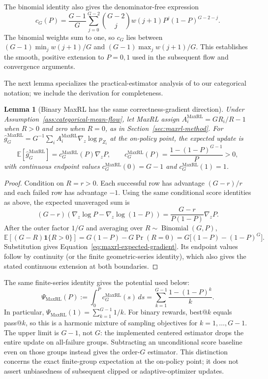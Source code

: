\documentclass{article}
\newcommand{\1}{\mathbf 1}
\newcommand{\E}{\mathbb E}
\newtheorem{lemma}{Lemma}[section]
\theoremstyle{remark}
\theoremstyle{definition}
\theoremstyle{plain}
\begin{document}
The binomial identity also gives the denominator-free expression
\[
 c_G(P)=\frac{G-1}{G}\sum_{j=0}^{G-2}\binom{G-2}{j}
 w(j+1)P^j(1-P)^{G-2-j}.
\]
The binomial weights sum to one, so $c_G$ lies between
$(G-1)\min_j w(j+1)/G$ and $(G-1)\max_j w(j+1)/G$.
This establishes the smooth, positive extension to $P=0,1$ used in the
subsequent flow and convergence arguments.

The next lemma specializes the practical-estimator analysis of
\citet[Section~4.3 and App.~D, Theorem~5]{tajwar2026maxrl}
to our categorical notation; we include the derivation for completeness.

\begin{lemma}[Binary MaxRL has the same correctness-gradient direction]
\label{lem:maxrl-mean}
Under Assumption~\ref{ass:categorical-mean-flow}, let MaxRL assign
$A_i^{\mathrm{MaxRL}}=GR_i/R-1$ when $R>0$ and zero when $R=0$, as in
Section~\ref{sec:maxrl-method}. For
$\widehat g_G^{\mathrm{MaxRL}}=G^{-1}\sum_i
 A_i^{\mathrm{MaxRL}}\nabla_z\log p_{Z_i}$ at the on-policy point, the
expected update is
\begin{equation}
  \E[\widehat g_G^{\mathrm{MaxRL}}]
  =c_G^{\mathrm{MaxRL}}(P)\nabla_zP,
  \qquad
  c_G^{\mathrm{MaxRL}}(P)
  =\frac{1-(1-P)^{G-1}}{P}>0,
  \label{eq:maxrl-expected-gradient}
\end{equation}
with continuous endpoint values
$c_G^{\mathrm{MaxRL}}(0)=G-1$ and
$c_G^{\mathrm{MaxRL}}(1)=1$.
\end{lemma}

\begin{proof}
Condition on $R=r>0$. Each successful row has advantage $(G-r)/r$ and each
failed row has advantage $-1$. Using the same conditional score identities as
above, the expected unaveraged sum is
\[
  (G-r)\!\left(\nabla_z\log P-\nabla_z\log(1-P)\right)
  =\frac{G-r}{P(1-P)}\nabla_zP.
\]
After the outer factor $1/G$ and averaging over
$R\sim\operatorname{Binomial}(G,P)$,
\[
 \E[(G-R)\1\{R>0\}]
 =G(1-P)-G\Pr(R=0)
 =G\big[(1-P)-(1-P)^G\big].
\]
Substitution gives Equation~\eqref{eq:maxrl-expected-gradient}. Its endpoint
values follow by continuity (or the finite geometric-series identity), which
also gives the stated continuous extension at both boundaries.
\end{proof}

The same finite-series identity gives the potential used below:
\begin{equation}
 \Psi_{\mathrm{MaxRL}}(P)
 :=\int_0^P c_G^{\mathrm{MaxRL}}(s)\,ds
 =\sum_{k=1}^{G-1}\frac{1-(1-P)^k}{k}.
 \label{eq:maxrl-potential-finite-sum}
\end{equation}
In particular, $\Psi_{\mathrm{MaxRL}}(1)=\sum_{k=1}^{G-1}1/k$.
For binary rewards, best@\(k\) equals pass@\(k\), so this is a harmonic
mixture of sampling objectives for $k=1,\ldots,G-1$. The upper limit is
$G-1$, not $G$: the implemented centered estimator drops the entire update
on all-failure groups. Subtracting an unconditional score baseline even on
those groups instead gives the order-$G$ estimator. This distinction concerns
the exact finite-group expectation at the on-policy point; it does not assert
unbiasedness of subsequent clipped or adaptive-optimizer updates.
\end{document}
